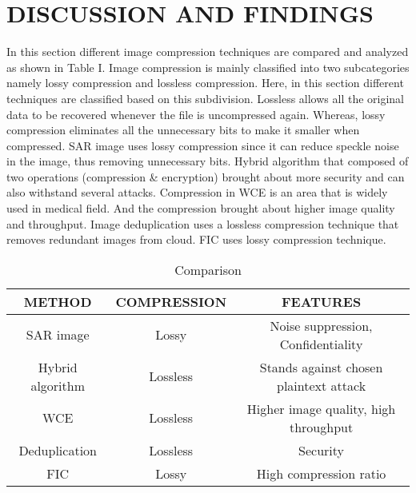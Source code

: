 \documentclass[10pt,a4paper,journal]{IEEEtran}
\begin{document}
\section{DISCUSSION AND FINDINGS}
\hspace{2em}  \hspace*{2em} In this section different image compression techniques are compared and analyzed as shown in Table I. Image compression is mainly classified into two subcategories namely lossy compression and lossless compression. Here, in this section different techniques are classified based on this subdivision. Lossless allows all the original data to be recovered whenever the file is uncompressed again. Whereas, lossy compression eliminates all the unnecessary bits to make it smaller when compressed. SAR image uses lossy compression since it can reduce speckle noise in the image, thus removing unnecessary bits. Hybrid algorithm that composed of two operations (compression \& encryption) brought about more security and can also withstand several attacks. Compression in  WCE is an area that is widely used in medical field. And the compression brought about higher image quality and throughput. Image deduplication uses a lossless compression technique that removes redundant images from cloud. FIC uses lossy compression technique.
		
\begin{table}[htbp]
\caption{Comparison}
\begin{tabular}{c|c|c}
\hline 
METHOD & COMPRESSION & FEATURES\\
\hline 
\rule[-1ex]{0pt}{2.5ex} SAR image & Lossy & Noise suppression, Confidentiality\\
\rule[-1ex]{0pt}{2.5ex} Hybrid algorithm & Lossless &  Stands against chosen plaintext attack\\
\rule[-1ex]{0pt}{2.5ex} WCE	&	Lossless 	&   Higher image quality, high throughput	\\
\rule[-1ex]{0pt}{2.5ex} Deduplication	&   Lossless 	&	Security	\\
\rule[-1ex]{0pt}{2.5ex} FIC	& Lossy & High compression ratio\\
\hline 
\end{tabular}
\label{av}

		\end{table}
		
\end{document}
